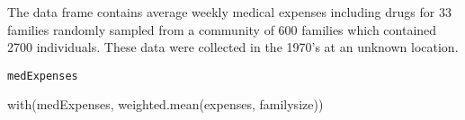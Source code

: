 \begin{Description}\relax
The  data frame  
contains average weekly medical expenses including drugs for 33 families
randomly sampled from a community of 600 families which contained
2700 individuals.  These data were collected in the 1970's at an 
unknown location.
\end{Description}
\begin{Usage}
\begin{verbatim}medExpenses\end{verbatim}
\end{Usage}
\begin{Format}\relax
{}
\end{Format}
\begin{Examples}
\begin{ExampleCode}
with(medExpenses, weighted.mean(expenses, familysize))
\end{ExampleCode}
\end{Examples}

